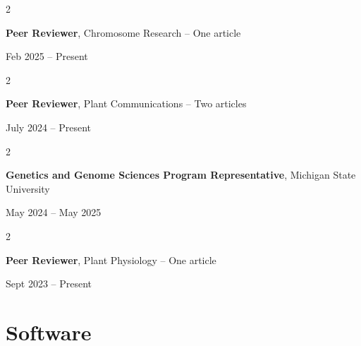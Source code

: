 \documentclass[10pt, letterpaper]{article}
\newenvironment{twocolentry}[2][]{
    \onecolentry
    \def\secondColumn{#2}
    \setcolumnwidth{\fill, 4.5 cm}
    \begin{paracol}{2}
}{
    \switchcolumn \raggedleft \secondColumn
    \end{paracol}
    \endonecolentry
} %
\begin{document}
        \vspace{0.2 cm} 

        
        \begin{samepage} 
            \begin{twocolentry}{
                Feb 2025 – Present
                }
                \textbf{Peer Reviewer}, Chromosome Research -- One article
            \end{twocolentry}
        \end{samepage} 


        \vspace{0.2 cm} 
        

        \begin{samepage} 
            \begin{twocolentry}{
                July 2024 – Present
                }
                \textbf{Peer Reviewer}, Plant Communications -- Two articles
            \end{twocolentry}
        \end{samepage} 


        \vspace{0.2 cm} 

        
        \begin{samepage} 
            \begin{twocolentry}{
                May 2024 – May 2025
                }
                \textbf{Genetics and Genome Sciences Program Representative}, Michigan State University
            \end{twocolentry}
        \end{samepage}  


        \vspace{0.2 cm}


        \begin{samepage} 
            \begin{twocolentry}{
                Sept 2023 – Present
                }
                \textbf{Peer Reviewer}, Plant Physiology -- One article
            \end{twocolentry}
        \end{samepage}
      
        


    \section{Software}
\end{document}
